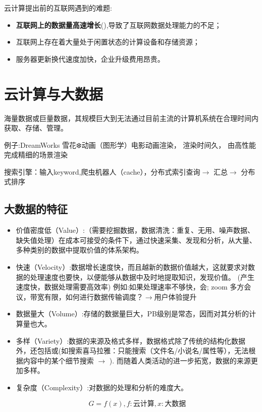云计算提出前的互联网遇到的难题:
\begin{itemize}
    \item \textbf{互联网上的数据量高速增长}(),导致了互联网数据处理能力的不足；
    \item 互联网上存在着大量处于闲置状态的计算设备和存储资源；
    \item 服务器更新换代速度加快，企业升级费用昂贵。 
\end{itemize}

\section{云计算与大数据}

\begin{definition}
    海量数据或巨量数据，其规模巨大到无法通过目前主流的计算机系统在合理时间内获取、存储、管理。
\end{definition}

例子:DreamWorks 雪花❄️动画（图形学）电影动画渲染， 渲染时间久， 由高性能完成精细的场景渲染

搜索引擎：输入keyword,爬虫机器人（cache），分布式索引查询$\rightarrow$ 汇总$\rightarrow$ 分布式排序

\subsection{大数据的特征}

\begin{itemize}
    \item 价值密度低（Value）:（需要挖掘数据，数据清洗：重复、无用、噪声数据、缺失值处理）在成本可接受的条件下，通过快速采集、发现和分析，从大量、多种类别的数据中提取价值的体系架构。 

    \item 快速（Velocity）:数据增长速度快，而且越新的数据价值越大，这就要求对数据的处理速度也要快，以便能够从数据中及时地提取知识，发现价值。 (产生速度快，数据处理需要高效率) 例如:如果处理速率不够快，会; zoom 多方会议，带宽有限，如何进行数据传输调度？$\rightarrow$用户体验提升

    \item 数据量大（Volume）:存储的数据量巨大，PB级别是常态，因而对其分析的计算量也大。 

    \item  多样（Variety）:数据的来源及格式多样，数据格式除了传统的结构化数据外，还包括或(如搜索喜马拉雅：只能搜索（文件名/小说名/属性等），无法根据内容中的某个细节搜索 $\rightarrow$ ). 而随着人类活动的进一步拓宽，数据的来源更加多样。 

   \item 复杂度（Complexity）:对数据的处理和分析的难度大。 

   \begin{equation}G=f(x), f:\text{云计算}, x:\text{大数据}\end{equation}
\end{itemize}



